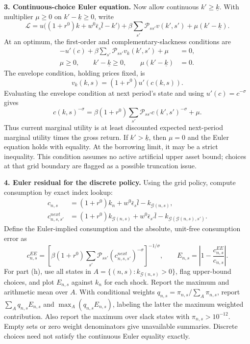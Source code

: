 \documentclass[11pt]{article}
\newcommand{\G}{\mathcal G}
\newcommand{\PP}{\mathcal P}
\begin{document}
\newpage
\textbf{3. Continuous-choice Euler equation.}
Now allow continuous $k'\geq\underline k$. With multiplier $\mu\geq0$ on
$k'-\underline k\geq0$, write
\[
\mathcal L=u\big((1+r^0)k+w^0\bar\epsilon_s\bar l-k'\big)
+\beta\sum_{s'}\PP_{ss'}v(k',s')+\mu(k'-\underline k).
\]
At an optimum, the first-order and complementary-slackness conditions are
\begin{align}
-u'(c)+\beta\sum_{s'}\PP_{ss'}v_k(k',s')+\mu&=0,\\
\mu\geq0,\qquad k'-\underline k\geq0,\qquad\mu(k'-\underline k)&=0.
\end{align}
The envelope condition, holding prices fixed, is
\begin{equation}
v_k(k,s)=(1+r^0)u'(c(k,s)).
\end{equation}
Evaluating the envelope condition at next period's state and using $u'(c)=c^{-\sigma}$ gives
\begin{equation}
\boxed{c(k,s)^{-\sigma}
=\beta(1+r^0)\sum_{s'}\PP_{ss'}c(k',s')^{-\sigma}+\mu.}
\end{equation}
Thus current marginal utility is at least discounted expected next-period marginal utility
times the gross return. If $k'>\underline k$, then $\mu=0$ and the Euler equation holds
with equality. At the borrowing limit, it may be a strict inequality. This condition
assumes no active artificial upper asset bound; choices at that grid boundary are flagged
as a possible truncation issue.

\textbf{4. Euler residual for the discrete policy.}
Using the grid policy, compute consumption by exact index lookup:
\begin{align}
c_{n,s}&=(1+r^0)k_n+w^0\bar\epsilon_s\bar l-k_{\G(n,s)},\\
c^{next}_{n,s,s'}&=(1+r^0)k_{\G(n,s)}+w^0\bar\epsilon_{s'}\bar l
-k_{\G(\G(n,s),s')}.
\end{align}
Define the Euler-implied consumption and the absolute, unit-free consumption error as
\begin{equation}
c^{EE}_{n,s}=\left[\beta(1+r^0)\sum_{s'}\PP_{ss'}
(c^{next}_{n,s,s'})^{-\sigma}\right]^{-1/\sigma},
\qquad \boxed{E_{n,s}=\left|1-\frac{c^{EE}_{n,s}}{c_{n,s}}\right|.}
\end{equation}
For part (h), use all states in $A=\{(n,s):k_{\G(n,s)}>0\}$, flag upper-bound choices,
and plot $E_{n,s}$ against $k_n$ for each shock. Report the maximum and arithmetic mean
over $A$. With conditional weights $q_{n,s}=\pi_{n,s}/\sum_A\pi_{n,s}$,
report $\sum_Aq_{n,s}E_{n,s}$ and $\max_A(q_{n,s}E_{n,s})$, labeling the latter
the maximum weighted contribution. Also report the maximum over slack states with
$\pi_{n,s}>10^{-12}$. Empty sets or zero weight denominators give unavailable summaries.
Discrete choices need not satisfy the continuous Euler equality exactly.
\end{document}
